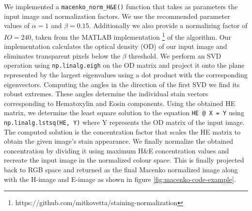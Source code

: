 \documentclass{l4proj}
\begin{document}
We implemented a \texttt{macenko\_norm\_H\&E()} function that takes as parameters the input image and  normalization factors. We use the recommended parameter values of \(\alpha = 1\) and \(\beta = 0.15\). Additionally we also provide a normalizing factor of \(IO = 240\), taken from the MATLAB implementation \footnote{https://github.com/mitkovetta/staining-normalization} of the algorithm. Our implementation calculates the optical density (OD) of our input image and eliminates transparent pixels below the \(\beta\) threshold. We perform an SVD operation using \texttt{np.linalg.eigh} on the OD matrix and project it onto the plane represented by the largest eigenvalues using a dot product with the corresponding eigenvectors. Computing the angles in the direction of the first SVD we find its robust extremes. These angles determine the individual stain vectors corresponding to Hematoxylin and Eosin components. Using the obtained HE matrix, we determine the least square solution to the equation \texttt{HE @ X = Y} using \texttt{np.linalg.lstsq(HE, Y)} where Y represents the OD matrix of the input image. The computed solution is the concentration factor that scales the HE matrix to obtain the given image's stain appearance. We finally normalize the obtained concentration by dividing it using maximum H\&E concentration values and recreate the input image in the normalized colour space. This is finally projected back to RGB space and returned as the final Macenko normalized image along with the H-image and E-image as shown in figure \ref{fig:macenko-code-example}.
\end{document}
